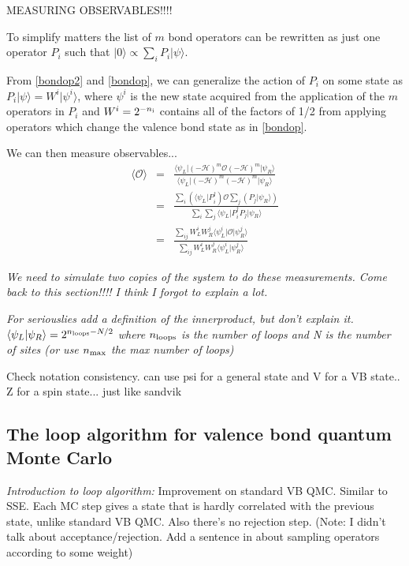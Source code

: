 \documentclass[prb,aps,twocolumn,floatfix,amsmath,amssymb,superscriptaddress,tightenlines]{revtex4}
\begin{document}
MEASURING OBSERVABLES!!!!  

To simplify matters the list of $m$ bond operators can be rewritten as just one operator $P_i$ such that $\lvert 0 \rangle \propto \sum_i P_i \lvert \psi\rangle$.

From \eqref{bondop2} and \eqref{bondop}, we can generalize the action of $P_i$ on some state as $P_i \lvert \psi\rangle = W^i  \lvert \psi^i\rangle$, where $ \psi^i$ is the new state acquired from the application of the $m$ operators in $P_i$ and $W^i = 2^{-n_{\rm i}}$ contains all of the factors of 1/2 from applying operators which change the valence bond state as in \eqref{bondop}.

We can then measure observables...
\begin{eqnarray}
\langle \mathcal{O}\rangle  &=& \frac{ \langle \psi_L \rvert (-\mathcal{H})^m\mathcal{O}(-\mathcal{H})^m \lvert \psi_R \rangle}{ \langle \psi_L \rvert (-\mathcal{H})^m(-\mathcal{H})^m \lvert \psi_R \rangle}  \label{measure}\\
&=& \frac{\sum_i (\langle \psi_L \rvert P_i^{\dagger})\mathcal{O}\sum_j(P_j \lvert \psi_R \rangle)}{\sum_i\sum_j \langle \psi_L \rvert P_i^{\dagger}P_j \lvert \psi_R \rangle} \\
&=&  \frac{\sum_{ij} W_L^iW_R^j\langle \psi_L^i \rvert \mathcal{O}\lvert \psi_R^j \rangle}{\sum_{ij} W_L^iW_R^j\langle \psi_L^i \rvert \psi_R^j \rangle} 
\end{eqnarray}

{\it We need to simulate two copies of the system to do these measurements.  
Come back to this section!!!!  I think I forgot to explain a lot. }

{\it For seriouslies add a definition of the innerproduct, but don't explain it.  
$\langle \psi_L \rvert \psi_R \rangle = 2^{n_{\rm loops} - N/2}$ where $n_{\rm loops}$ is the number
of loops and N is the number of sites  (or use $n_{\rm max}$ the max number of loops)

Check notation consistency.  can use psi for a general state and V for a VB state.. Z for a spin state... just like sandvik
}

\subsection{The loop algorithm for valence bond quantum Monte Carlo}

{\it Introduction to loop algorithm:}
Improvement on standard VB QMC.  Similar to SSE.  Each MC step gives a state that is hardly correlated with the previous state, unlike standard VB QMC.  Also there's no rejection step.  (Note: I didn't talk about acceptance/rejection.  Add a sentence in about sampling operators according to some weight)
\end{document}
